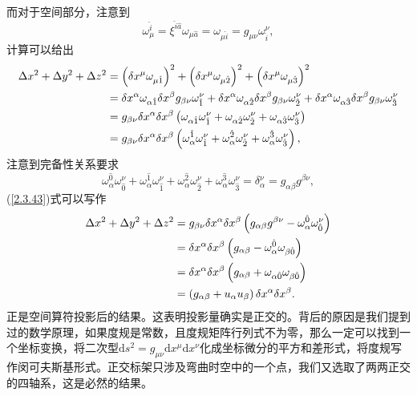 \documentclass[11pt, a4paper, oneside, onecolumn]{ctexart}
\numberwithin{equation}{subsection}
\begin{document}
而对于空间部分，注意到
\begin{equation}
\omega_{\mu}^{\hat{i}}=\xi^{\hat{i}\hat{a}}\omega_{\mu\hat{a}}=\omega_{\mu\hat{i}}=g_{\mu\nu}\omega^{\nu}_{\hat{i}},
\end{equation}
计算可以给出
\begin{align}
\Delta{}x^{2}+\Delta{}y^{2}+\Delta{}z^{2}&=\left(\delta{}x^{\mu}\omega_{\mu\hat{1}}\right)^{2}+\left(\delta{}x^{\mu}\omega_{\mu\hat{2}}\right)^{2}+\left(\delta{}x^{\mu}\omega_{\mu\hat{3}}\right)^{2}\notag\\
&=\delta{}x^{\alpha}\omega_{\alpha\hat{1}}\delta{}x^{\beta}g_{\beta\nu}\omega^{\nu}_{\hat{1}}+\delta{}x^{\alpha}\omega_{\alpha\hat{2}}\delta{}x^{\beta}g_{\beta\nu}\omega^{\nu}_{\hat{2}}+\delta{}x^{\alpha}\omega_{\alpha\hat{3}}\delta{}x^{\beta}g_{\beta\nu}\omega^{\nu}_{\hat{3}}\notag\\
&=g_{\beta\nu}\delta{}x^{\alpha}\delta{}x^{\beta}\left(\omega_{\alpha\hat{1}}\omega^{\nu}_{\hat{1}}+\omega_{\alpha\hat{2}}\omega^{\nu}_{\hat{2}}+\omega_{\alpha\hat{3}}\omega^{\nu}_{\hat{3}}\right)\notag\\
&=g_{\beta\nu}\delta{}x^{\alpha}\delta{}x^{\beta}\left(\omega_{\alpha}^{\hat{1}}\omega^{\nu}_{\hat{1}}+\omega_{\alpha}^{\hat{2}}\omega^{\nu}_{\hat{2}}+\omega_{\alpha}^{\hat{3}}\omega^{\nu}_{\hat{3}}\right),\label{2.3.43}
\end{align}
注意到完备性关系要求
\begin{equation}
\omega_{\alpha}^{\hat{0}}\omega^{\nu}_{\hat{0}}+\omega_{\alpha}^{\hat{1}}\omega^{\nu}_{\hat{1}}+\omega_{\alpha}^{\hat{2}}\omega^{\nu}_{\hat{2}}+\omega_{\alpha}^{\hat{3}}\omega^{\nu}_{\hat{3}}=\delta{}^{\nu}_{\alpha}=g_{\alpha\beta}g^{\beta\nu},
\end{equation}
(\ref{2.3.43})式可以写作
\begin{align}
\Delta{}x^{2}+\Delta{}y^{2}+\Delta{}z^{2}&=g_{\beta\nu}\delta{}x^{\alpha}\delta{}x^{\beta}\left(g_{\alpha\beta}g^{\beta\nu}-\omega_{\alpha}^{\hat{0}}\omega^{\nu}_{\hat{0}}\right)\notag\\
&=\delta{}x^{\alpha}\delta{}x^{\beta}\left(g_{\alpha\beta}-\omega^{\hat{0}}_{\alpha}\omega_{\beta\hat{0}}\right)\notag\\
&=\delta{}x^{\alpha}\delta{}x^{\beta}\left(g_{\alpha\beta}+\omega_{\alpha\hat{0}}\omega_{\beta\hat{0}}\right)\notag\\
&=\left(g_{\alpha\beta}+u_{\alpha}u_{\beta}\right)\delta{}x^{\alpha}\delta{}x^{\beta}.
\end{align}
正是空间算符投影后的结果。这表明投影量确实是正交的。背后的原因是我们提到过的数学原理，如果度规是常数，且度规矩阵行列式不为零，那么一定可以找到一个坐标变换，将二次型$\mathrm{d}s^{2}=g_{\mu\nu}\mathrm{d}x^{\mu}\mathrm{d}x^{\nu}$化成坐标微分的平方和差形式，将度规写作闵可夫斯基形式。正交标架只涉及弯曲时空中的一个点，我们又选取了两两正交的四轴系，这是必然的结果。
\end{document}
